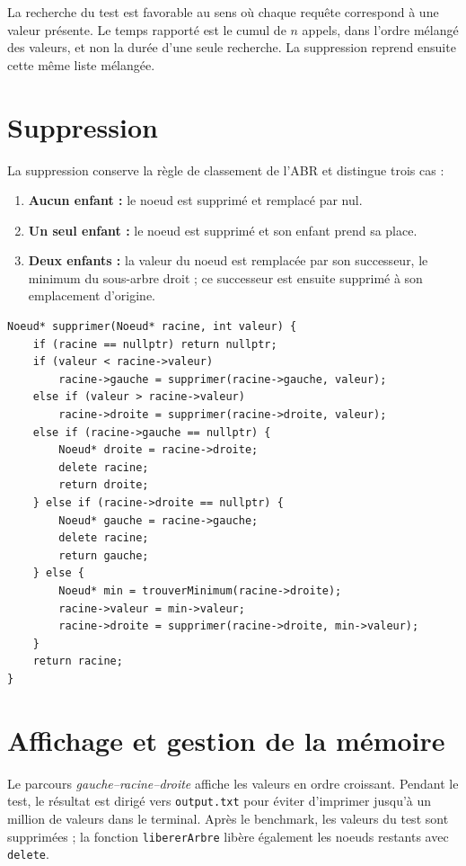 \documentclass[10pt,a4paper]{article}
\begin{document}
La recherche du test est favorable au sens où chaque requête correspond à
une valeur présente. Le temps rapporté est le cumul de $n$ appels, dans
l'ordre mélangé des valeurs, et non la durée d'une seule recherche. La
suppression reprend ensuite cette même liste mélangée.

\newpage
\section{Suppression}
La suppression conserve la règle de classement de l'ABR et distingue trois
cas :
\begin{enumerate}
    \setlength{\itemsep}{0pt}
    \item \textbf{Aucun enfant :} le noeud est supprimé et remplacé par nul.
    \item \textbf{Un seul enfant :} le noeud est supprimé et son enfant prend
    sa place.
    \item \textbf{Deux enfants :} la valeur du noeud est remplacée par son
    successeur, le minimum du sous-arbre droit ; ce successeur est ensuite
    supprimé à son emplacement d'origine.
\end{enumerate}

\begin{lstlisting}
Noeud* supprimer(Noeud* racine, int valeur) {
    if (racine == nullptr) return nullptr;
    if (valeur < racine->valeur)
        racine->gauche = supprimer(racine->gauche, valeur);
    else if (valeur > racine->valeur)
        racine->droite = supprimer(racine->droite, valeur);
    else if (racine->gauche == nullptr) {
        Noeud* droite = racine->droite;
        delete racine;
        return droite;
    } else if (racine->droite == nullptr) {
        Noeud* gauche = racine->gauche;
        delete racine;
        return gauche;
    } else {
        Noeud* min = trouverMinimum(racine->droite);
        racine->valeur = min->valeur;
        racine->droite = supprimer(racine->droite, min->valeur);
    }
    return racine;
}
\end{lstlisting}

\section{Affichage et gestion de la mémoire}
Le parcours \emph{gauche--racine--droite} affiche les valeurs en ordre
croissant. Pendant le test, le résultat est dirigé vers \texttt{output.txt}
pour éviter d'imprimer jusqu'à un million de valeurs dans le terminal.
Après le benchmark, les valeurs du test sont supprimées ; la fonction
\texttt{libererArbre} libère également les noeuds restants avec \texttt{delete}.
\end{document}
